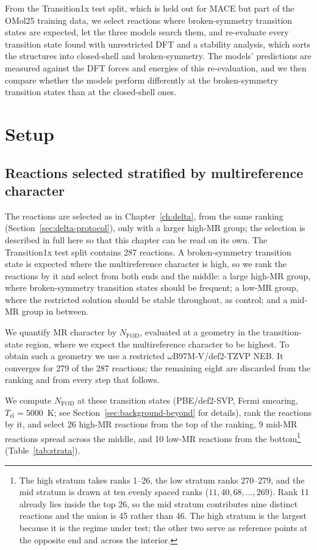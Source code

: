 From the Transition1x test split, which is held out for MACE but part
of the OMol25 training data, we select reactions where
broken-symmetry transition states are expected, let the three models
search them, and re-evaluate every transition state found with
unrestricted DFT and a stability analysis, which sorts the structures
into closed-shell and broken-symmetry. The models' predictions are
measured against the DFT forces and energies of this re-evaluation, and
we then compare whether the models perform differently at the
broken-symmetry transition states than at the closed-shell ones.

\section{Setup}
\label{sec:omol-setup}

\subsection{Reactions selected stratified by multireference character}
\label{sec:reactions}
The reactions are selected as in Chapter~\ref{ch:delta}, from the
same ranking (Section~\ref{sec:delta-protocol}), only with a larger
high-MR group; the selection is described in full here so that this
chapter can be read on its own. The Transition1x test split contains
287 reactions. A broken-symmetry
transition state is expected where the multireference character is
high, so we rank the reactions by it and select from both ends and the
middle: a large high-MR group, where broken-symmetry transition states
should be frequent; a low-MR group, where the restricted solution
should be stable throughout, as control; and a mid-MR group
in between.

We quantify MR character by $N_\mathrm{FOD}$, evaluated at a geometry in the
transition-state region, where we expect the multireference character to be
highest. To obtain such a geometry we use a restricted
\mbox{$\omega$B97M-V/def2-TZVP} NEB. It converges for 279 of the 287
reactions; the remaining eight are discarded from the ranking and
from every step that follows.

We compute $N_\mathrm{FOD}$ at these transition states (PBE/def2-SVP, Fermi
smearing, $T_\mathrm{el} = 5000$~K; see
Section~\ref{sec:background-beyond} for details), rank the reactions by
it, and select 26 high-MR reactions from the top of the ranking, 9 mid-MR
reactions spread across the middle, and 10 low-MR reactions from the
bottom\footnote{The high stratum takes ranks 1--26, the low stratum ranks
270--279, and the mid stratum is drawn at ten evenly spaced ranks
($11, 40, 68, \dots, 269$). Rank 11 already lies inside the top 26, so the mid
stratum contributes nine distinct reactions and the union is 45 rather than 46.
The high stratum is the largest because it is the regime under test; the other
two serve as reference points at the opposite end and across the interior.}
(Table~\ref{tab:strata}).

